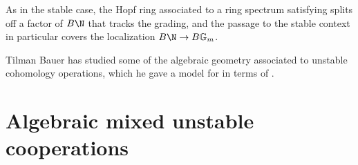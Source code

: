 \begin{remark}
As in the stable case, the Hopf ring associated to a ring spectrum satisfying {\UFH} splits off a factor of \(B\N\) that tracks the grading, and the passage to the stable context in particular covers the localization \(B\N \to B\Gm\).
\end{remark}

\begin{remark}
Tilman Bauer has studied some of the algebraic geometry associated to unstable cohomology operations, which he gave a model for in terms of .
\end{remark}










\section{Algebraic mixed unstable cooperations}\label{UnstableAlgebraicModelSection}

